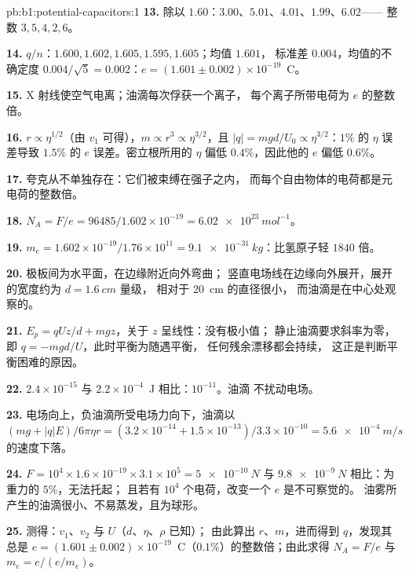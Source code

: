 \begin{solution}{pb:b1:potential-capacitors:1}
\textbf{13.} 除以 $1.60$：$3.00$、$5.01$、$4.01$、$1.99$、$6.02$——
整数 $3, 5, 4, 2, 6$。

\textbf{14.} $q/n$：$1.600, 1.602, 1.605, 1.595, 1.605$；均值 $1.601$，
标准差 $0.004$，均值的不确定度 $0.004/\sqrt5 =
0.002$：$e = (1.601 \pm 0.002) \times 10^{-19}$~C。

\textbf{15.} X 射线使空气电离；油滴每次俘获一个离子，
每个离子所带电荷为 $e$ 的整数倍。

\textbf{16.} $r \propto \eta^{1/2}$（由 $v_1$ 可得），$m \propto r^3 \propto \eta^{3/2}$，且
$|q| = mgd/U_0 \propto \eta^{3/2}$：$1\%$ 的 $\eta$ 误差导致 $1.5\%$ 的 $e$ 误差。密立根所用的
$\eta$ 偏低 $0.4\%$，因此他的 $e$ 偏低 $0.6\%$。

\textbf{17.} 夸克从不单独存在：它们被束缚在强子之内，
而每个自由物体的电荷都是元电荷的整数倍。

\textbf{18.} $N_A = F/e = 96485/1.602 \times 10^{-19} = \qty{6.02e23}{mol^{-1}}$。

\textbf{19.} $m_e = 1.602 \times 10^{-19}/1.76 \times 10^{11} = \qty{9.1e-31}{kg}$：比氢原子轻
$1840$ 倍。

\textbf{20.} 极板间为水平面，在边缘附近向外弯曲；
竖直电场线在边缘向外展开，展开的宽度约为 $d = \qty{1.6}{cm}$ 量级，
相对于 \qty{20}{cm} 的直径很小，
而油滴是在中心处观察的。

\textbf{21.} $E_p = qUz/d + mgz$，关于 $z$ 呈线性：没有极小值；
静止油滴要求斜率为零，即 $q = -mgd/U$，此时平衡为随遇平衡，
任何残余漂移都会持续，
这正是判断平衡困难的原因。

\textbf{22.} $2.4 \times 10^{-15}$ 与 $2.2 \times 10^{-4}$~J 相比：$10^{-11}$。油滴
不扰动电场。

\textbf{23.} 电场向上，负油滴所受电场力向下，油滴以 $(mg
+ |q|E)/6\pi\eta r = (3.2 \times 10^{-14} + 1.5 \times 10^{-13})/3.3 \times 10^{-10} =
\qty{5.6e-4}{m/s}$ 的速度下落。

\textbf{24.} $F = 10^4 \times 1.6 \times 10^{-19} \times 3.1 \times 10^5 = \qty{5e-10}{N}$
与 $\qty{9.8e-9}{N}$ 相比：为重力的 $5\%$，无法托起；
且若有 $10^4$ 个电荷，改变一个 $e$ 是不可察觉的。
油雾所产生的油滴很小、不易蒸发，且为球形。

\textbf{25.} 测得：$v_1$、$v_2$ 与 $U$（$d$、$\eta$、$\rho$ 已知）；
由此算出 $r$、$m$，进而得到 $q$，发现其总是
$e = (1.601 \pm 0.002) \times 10^{-19}$~C（$0.1\%$）的整数倍；由此求得 $N_A = F/e$ 与
$m_e = e/(e/m_e)$。
\end{solution}
